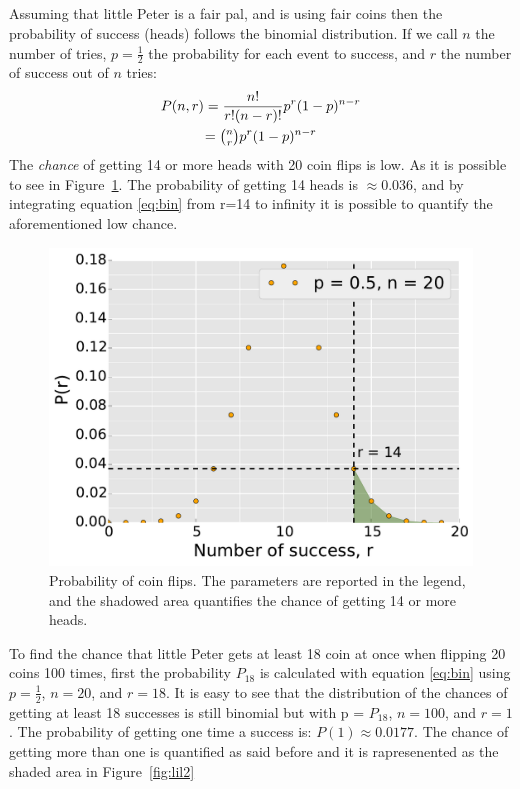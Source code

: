 \documentclass[twocolumn,10]{article}
\begin{document}
	\subsection{} %
	\label{sub:}
	Assuming that little Peter is a fair pal, and is using fair coins then the probability of success (heads) follows the binomial distribution.
	If we call $n$ the number of tries, $p= \frac{1}{2}$ the probability for each event to success, and $r$ the number of success out of $n$ tries:
	\begin{multline}
	\label{eq:bin}
		P (n,r) = \frac{n!}{r!(n-r)!} p ^ r (1-p)^{n-r} \\ 
		 = \tbinom n r p ^ r (1-p)^{n-r}
	\end{multline}
	The \emph{chance} of getting 14 or more heads with 20 coin flips is low. As it is possible to see in Figure~\ref{fig:lil}. The probability of getting 14 heads is $\approx 0.036$, and by integrating equation \ref{eq:bin} from r=14 to infinity it is possible to quantify the aforementioned low chance.
	\begin{figure}[h]
		\begin{center}
			\includegraphics[width=.4\textwidth]{fig/lil.pdf}
		\end{center}
		\caption{Probability of coin flips. The parameters are reported in the legend, and the shadowed area quantifies the chance of getting 14 or more heads.}
		\label{fig:lil}
	\end{figure}


	To find the chance that little Peter gets at least 18 coin at once when flipping 20 coins 100 times, first the probability $P_{18}$ is calculated with equation \ref{eq:bin} using $p= \frac{1}{2}$, $n=20$, and $r=18$.
	It is easy to see that the distribution of the chances of getting at least 18 successes is still binomial but with p = $P_{18}$, $n=100$, and $r=1$.
	The probability of getting one time a success is: $P(1) \approx 0.0177$. The chance of getting more than one is quantified as said before and it is rapresenented as the shaded area in Figure~\ref{fig:lil2}
\end{document}
